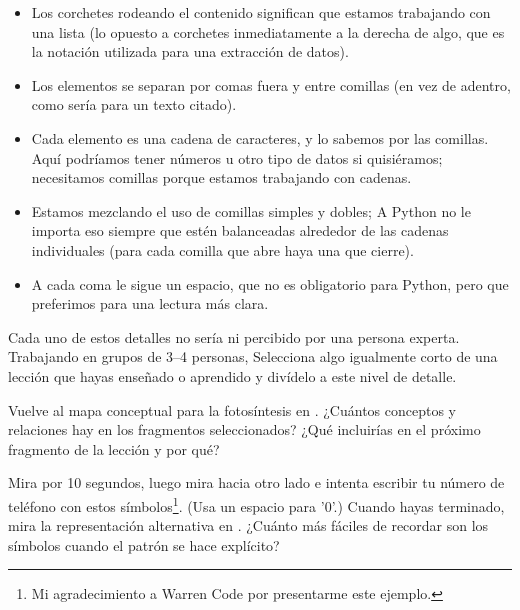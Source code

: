 \begin{itemize}

\item
  Los corchetes rodeando el contenido significan que estamos trabajando con una lista
  (lo opuesto a corchetes inmediatamente a la derecha de algo,
  que es la notación utilizada para una extracción de datos).

\item
  Los elementos se separan por comas fuera y entre comillas
  (en vez de adentro, como sería para un texto citado).

\item
  Cada elemento es una cadena de caracteres,
  y lo sabemos por las comillas.
  Aquí podríamos tener números u otro tipo de datos si quisiéramos;
  necesitamos comillas porque estamos trabajando con cadenas.

\item
  Estamos mezclando el uso de comillas simples y dobles;
  A Python no le importa eso siempre que estén balanceadas alrededor de las cadenas individuales (para cada comilla que abre haya una que cierre).

\item
  A cada coma le sigue un espacio,
  que no es obligatorio para Python,
  pero que preferimos para una lectura más clara.

\end{itemize}

Cada uno de estos detalles no sería ni percibido por una persona experta.
Trabajando en grupos de  3--4 personas,
Selecciona algo igualmente corto de una lección que hayas enseñado o aprendido
y divídelo a este nivel de detalle.


Vuelve al mapa conceptual para la fotosíntesis en .
¿Cuántos conceptos y relaciones hay en los fragmentos seleccionados?
¿Qué incluirías en el próximo fragmento de la lección y por qué?


Mira   por 10 segundos,
luego mira hacia otro lado e intenta escribir tu número de teléfono con estos símbolos\footnote{
  Mi agradecimiento a Warren Code por presentarme este ejemplo.
}.
(Usa un espacio para  '0'.)
Cuando hayas terminado,
mira la representación alternativa en .
¿Cuánto más fáciles de recordar son los símbolos cuando el patrón se hace explícito?

